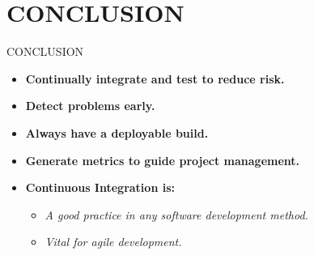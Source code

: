 \documentclass{beamer}
\begin{document}
\section{CONCLUSION}
\begin{frame}{CONCLUSION}
\begin{itemize}
\vspace{10pt}
\item  \textbf{Continually integrate and test to reduce risk.}
\vspace{10pt}
\item  \textbf{Detect problems early.}
\vspace{10pt}
\item  \textbf{Always have a deployable build.}
\vspace{10pt}
\item  \textbf{Generate metrics to guide project management.}
\vspace{10pt}
\item   \textbf{Continuous Integration is:}
\begin{itemize}
\vspace{10pt}
\item \textit{A good practice in any software development method.}
\vspace{10pt}
\item \textit{Vital for agile development.}
\end{itemize}
\end{itemize}
\end{frame}








\end{document}
